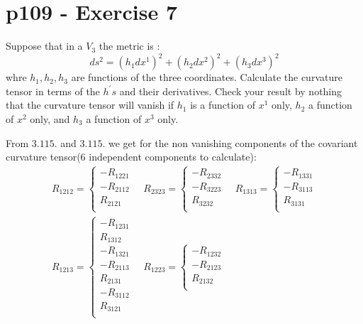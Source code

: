 \section{p109 - Exercise 7}
\begin{tcolorbox}
Suppose that in a $V_3$ the metric is :$$ ds^2= (h_1dx^1)^2+(h_2dx^2)^2+(h_3dx^3)^2$$ whre $h_1, h_2, h_3$ are functions of the three coordinates. Calculate the curvature  tensor in terms of the $h^{'}s$ and their derivatives. Check your result by nothing that the curvature tensor will vanish if $h_1$ is a function of $x^1$ only, $h_2$ a function of $x^2$ only, and $h_3$  a function of $x^3$ only.
\end{tcolorbox}
From $\mathbf{3.115.}$ and $\mathbf{3.115.}$ we get for the non vanishing components of the covariant curvature tensor($6$ independent components to calculate):
\begin{align}
R_{1212} =\left\{ \begin{array}{c}
- R_{1221} \\
- R_{2112} \\
 R_{2121} \\
\end{array}\right.  \quad R_{2323} =\left\{ \begin{array}{c}
- R_{2332} \\
- R_{3223} \\
 R_{3232} \\
\end{array}\right.  \quad R_{1313} =\left\{ \begin{array}{c}
- R_{1331} \\
- R_{3113} \\
 R_{3131} \\
\end{array}\right.  \\
R_{1213} =\left\{ \begin{array}{c}
- R_{1231} \\
 R_{1312} \\
 -R_{1321} \\
- R_{2113} \\
 R_{2131} \\
 -R_{3112} \\
 R_{3121} \\
\end{array}\right.  \quad
R_{1223} =\left\{ \begin{array}{c}
- R_{1232} \\
- R_{2123} \\
 R_{2132} \\

\end{array}
\end{align}
